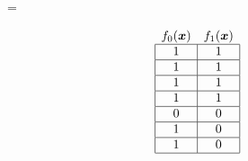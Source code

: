 \begin{figure}[!htb]
\begin{minipage}{.95\linewidth}
\begin{minipage}[b]{.21\linewidth}
\begin{align*}
\begin{array}{cc}
      \end{array}
    \end{align*}
  \end{minipage}
  \begin{minipage}[b]{.1\linewidth}\centering
      =
      \vspace{4em}
  \end{minipage}
  \begin{minipage}[b]{.21\linewidth}\centering
    \begin{align*}
      \begin{array}{cc}
        f_0(\bm{x})                    & f_1(\bm{x})      \\ \hline
        \multicolumn{1}{|c|}{1} & \multicolumn{1}{c|}{1} \\ \hline
        \multicolumn{1}{|c|}{1} & \multicolumn{1}{c|}{1} \\ \hline
        \multicolumn{1}{|c|}{1} & \multicolumn{1}{c|}{1} \\ \hline
        \multicolumn{1}{|c|}{1} & \multicolumn{1}{c|}{1} \\ \hline
        \multicolumn{1}{|c|}{0} & \multicolumn{1}{c|}{0} \\ \hline
        \multicolumn{1}{|c|}{1} & \multicolumn{1}{c|}{0} \\ \hline
        \multicolumn{1}{|c|}{1} & \multicolumn{1}{c|}{0} \\ \hline
      \end{array}
    \end{align*}
  \end{minipage}
\end{minipage}


\end{figure}
